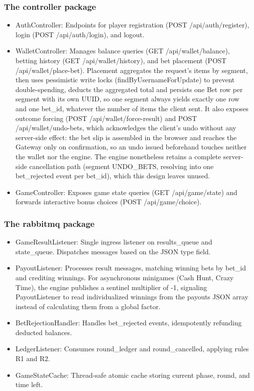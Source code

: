 \documentclass[12pt,a4paper]{article}
\begin{document}
\subsubsection{The controller package}
\begin{itemize}
    \item AuthController: Endpoints for player registration (POST /api/auth/register), login (POST /api/auth/login), and logout.
    \item WalletController: Manages balance queries (GET /api/wallet/balance), betting history (GET /api/wallet/history), and bet placement (POST /api/wallet/place-bet). Placement aggregates the request's items by segment, then uses pessimistic write locks (findByUsernameForUpdate) to prevent double-spending, deducts the aggregated total and persists one Bet row per segment with its own UUID, so one segment always yields exactly one row and one bet\_\allowbreak id, whatever the number of items the client sent. It also exposes outcome forcing (POST /api/wallet/force-result) and POST /api/wallet/undo-bets, which acknowledges the client's undo without any server-side effect: the bet slip is assembled in the browser and reaches the Gateway only on confirmation, so an undo issued beforehand touches neither the wallet nor the engine. The engine nonetheless retains a complete server-side cancellation path (segment UNDO\_\allowbreak BETS, resolving into one bet\_\allowbreak rejected event per bet\_\allowbreak id), which this design leaves unused.
    \item GameController: Exposes game state queries (GET /api/game/state) and forwards interactive bonus choices (POST /api/game/choice).
\end{itemize}

\subsubsection{The rabbitmq package}
\begin{itemize}
    \item GameResultListener: Single ingress listener on results\_\allowbreak queue and state\_\allowbreak queue. Dispatches messages based on the JSON type field.
    \item PayoutListener: Processes result messages, matching winning bets by bet\_\allowbreak id and crediting winnings. For asynchronous minigames (Cash Hunt, Crazy Time), the engine publishes a sentinel multiplier of -1, signaling PayoutListener to read individualized winnings from the payouts JSON array instead of calculating them from a global factor.
    \item BetRejectionHandler: Handles bet\_\allowbreak rejected events, idempotently refunding deducted balances.
    \item LedgerListener: Consumes round\_\allowbreak ledger and round\_\allowbreak cancelled, applying rules R1 and R2.
    \item GameStateCache: Thread-safe atomic cache storing current phase, round, and time left.
\end{itemize}
\end{document}
